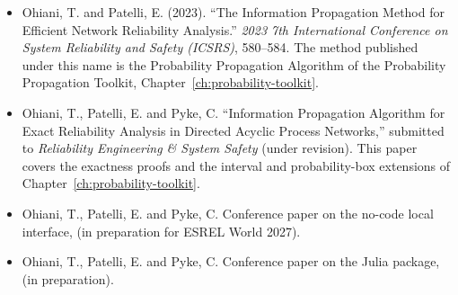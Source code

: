\documentclass[12pt]{report}
\begin{document}
\begin{itemize}
  \item Ohiani, T. and Patelli, E. (2023). ``The Information Propagation Method for Efficient
    Network Reliability Analysis.'' \textit{2023 7th International Conference on System
    Reliability and Safety (ICSRS)}, 580--584. The method published under this name is the
    Probability Propagation Algorithm of the Probability Propagation Toolkit, Chapter~\ref{ch:probability-toolkit}.
  \item Ohiani, T., Patelli, E. and Pyke, C. ``Information Propagation Algorithm for Exact
    Reliability Analysis in Directed Acyclic Process Networks,'' submitted to
    \textit{Reliability Engineering \& System Safety} (under revision). This paper covers
    the exactness proofs and the interval and probability-box extensions of
    Chapter~\ref{ch:probability-toolkit}.
  \item Ohiani, T., Patelli, E. and Pyke, C. Conference paper on the no-code local interface, (in preparation for ESREL World 2027).
  \item Ohiani, T., Patelli, E. and Pyke, C. Conference paper on the Julia package, (in preparation).
\end{itemize}

\ifdefined\maindoc
\else
\printbibliography
\end{document}

